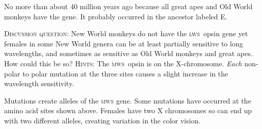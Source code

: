 \documentclass[12pt, addpoints]{exam}
\newcommand{\mws}{\textsc{mws}}
\newcommand{\lws}{\textsc{lws}}
\newcommand*\AnswerBox[2]{%
    \parbox[t][#1]{0.92\linewidth}{%
    \begin{solution}#2\end{solution}}
    \vspace{\stretch{1}}
}
\begin{document}
\begin{questions}
\AnswerBox{0.3\textheight}{No more than about 40 million years ago because all great apes and Old World monkeys have the gene. It probably occurred in the ancestor labeled E.}

\question
\textsc{Discussion question:} New World monkeys do not have the \lws{}~opsin gene yet females in some New World genera can be at least partially sensitive to long wavelengths, and sometimes as sensitive as Old World monkeys and great apes.  How could this be so? \textsc{Hints:} The \mws{}~opsin is on the X-chromosome. \emph{Each} non-polar to polar mutation at the three sites causes a slight increase in the wavelength sensitivity.

\AnswerBox{0.3\textheight}{Mutations create alleles of the \mws{} gene. Some mutations have occurred at the amino acid sites shown above. Females have two X chromosomes so can end up with two different alleles, creating variation in the color vision.}

\end{questions}
\end{document}
